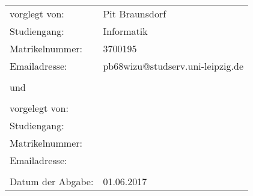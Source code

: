 \begin{titlepage}
\LARGE{}\\

\normalsize
{}
\textbf{}
\vfill
\begin{tabular}{ll}
vorglegt von: & Pit Braunsdorf\\
Studiengang: & Informatik \\
Matrikelnummer: & 3700195 \\
Emailadresse: & pb68wizu@studserv.uni-leipzig.de \\
\\
und &\\
\\
vorgelegt von: & \\
Studiengang: & \\
Matrikelnummer: & \\
Emailadresse: & \\
\\
Datum der Abgabe: & 01.06.2017 \\
\end{tabular}
\end{titlepage}